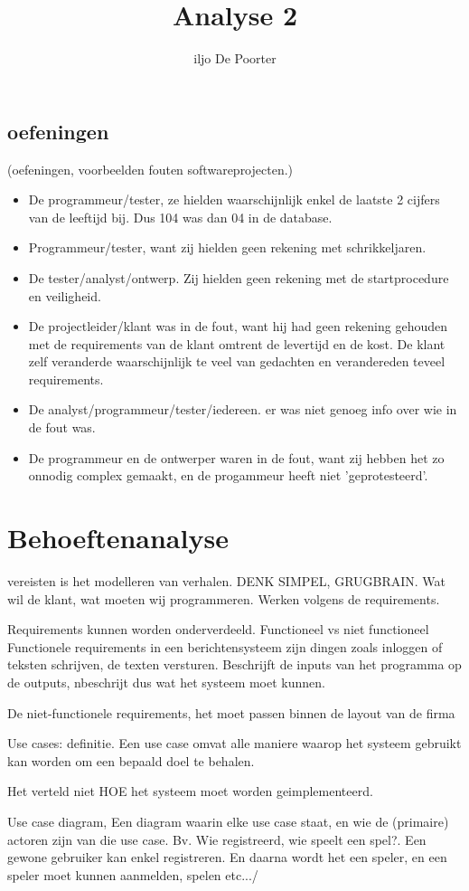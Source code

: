 \documentclass{article}
\author{iljo De Poorter}
\title{Analyse 2}
\begin{document}
\subsection{oefeningen}
(oefeningen, voorbeelden fouten softwareprojecten.)
\begin{itemize}
\item De programmeur/tester, ze hielden waarschijnlijk enkel de laatste 2 cijfers van de leeftijd bij. Dus 104 was dan 04 in de database.
\item Programmeur/tester, want zij hielden geen rekening met schrikkeljaren.
\item De tester/analyst/ontwerp. Zij hielden geen rekening met de startprocedure en veiligheid.
\item De projectleider/klant was in de fout, want hij had geen rekening gehouden met de requirements van de klant omtrent de levertijd en de kost. De klant zelf veranderde waarschijnlijk te veel van gedachten en verandereden teveel requirements.
\item De analyst/programmeur/tester/iedereen. er was niet genoeg info over wie in de fout was.
\item De programmeur en de ontwerper waren in de fout, want zij hebben het zo onnodig complex gemaakt, en de progammeur heeft niet 'geprotesteerd'.
\end{itemize}

\section{Behoeftenanalyse}

vereisten is het modelleren van verhalen.
DENK SIMPEL, GRUGBRAIN.
Wat wil de klant, wat moeten wij programmeren. Werken volgens de requirements.

Requirements kunnen worden onderverdeeld.
Functioneel vs niet functioneel
Functionele requirements in een berichtensysteem zijn dingen zoals inloggen of teksten schrijven, de texten versturen. Beschrijft de inputs van het programma op de outputs, nbeschrijt dus wat het systeem moet kunnen. 

De niet-functionele requirements, het moet passen binnen de layout van de firma

Use cases: definitie.
Een use case omvat alle maniere waarop het systeem gebruikt kan worden om een bepaald doel te behalen.

Het verteld niet HOE het systeem moet worden geimplementeerd.

Use case diagram, Een diagram waarin elke use case staat, en wie de (primaire) actoren zijn van die use case. Bv. Wie registreerd, wie speelt een spel?. Een gewone gebruiker kan enkel registreren. En daarna wordt het een speler, en een speler moet kunnen aanmelden, spelen etc.../ 
\end{document}
